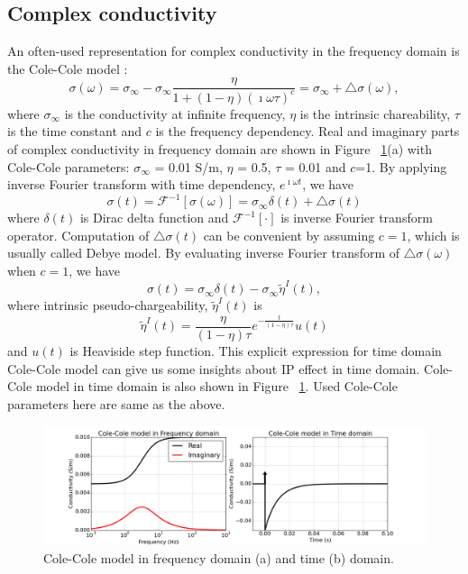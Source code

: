 \documentclass[a4paper, 11pt]{article}
\newcommand{\siginf}{\sigma_\infty}
\newcommand{\peta}{\tilde{\eta}}
\begin{document}
\subsection{Complex conductivity}
An often-used representation for complex conductivity in the frequency domain is the Cole-Cole model \cite{COLE}:
\begin{equation}
  \sigma(\omega) = \sigma_{\infty} - \sigma_{\infty}\frac{\eta}{1+(1-\eta)(\imath\omega\tau)^c} = \sigma_{\infty} + \triangle\sigma(\omega),
  \label{eq: sigma_freq}
\end{equation}
where $\sigma_{\infty}$ is the conductivity at infinite frequency, $\eta$ is the intrinsic chareability, $\tau$ is the time constant and $c$ is the frequency dependency. Real and imaginary parts of complex conductivity in frequency domain are shown in Figure ~\ref{Fig:FDandTDCole}(a) with Cole-Cole parameters: $\siginf$ = 0.01 S/m, $\eta $ = 0.5, $\tau$ = 0.01 and $c$=1. By applying inverse Fourier transform with time dependency, $e^{\imath\omega t}$, we have
\begin{equation}
  \sigma(t) = \mathscr{F}^{-1}[\sigma(\omega)] = \sigma_{\infty}\delta(t) + \triangle\sigma(t)
  \label{eq: sigma_time}
\end{equation}
where $\delta(t)$ is Dirac delta function and $\mathscr{F}^{-1}[\cdot]$ is inverse Fourier transform operator. Computation of $\triangle\sigma(t)$ can be convenient by assuming $c=1$, which is usually called Debye model. By evaluating inverse Fourier transform of $\triangle\sigma(\omega)$ when $c=1$, we have
\begin{equation}
  \sigma(t) = \sigma_{\infty}\delta(t) - \siginf\peta^{I}(t),
  \label{eq: sigma_time_c1}
\end{equation}
where intrinsic pseudo-chargeability, $\peta^{I}(t)$ is
\begin{equation}
    \peta^{I}(t) = \frac{\eta}{(1-\eta)\tau}e^{-\frac{t}{(1-\eta)\tau}}u(t)
    \label{eq: intrinsic_peta}
\end{equation}
and $u(t)$ is Heaviside step function. This explicit expression for time domain Cole-Cole model can give us some insights about IP effect in time domain. Cole-Cole model in time domain is also shown in Figure ~\ref{Fig:FDandTDCole}. Used Cole-Cole parameters here are same as the above.

\begin{figure}[htb]
  \centering
  \includegraphics[width=1.0\textwidth]{figures/FDandTDCole.png}
  \caption{Cole-Cole model in frequency domain (a) and time (b) domain. }
  \label{Fig:FDandTDCole}
\end{figure}
\clearpage
\end{document}
